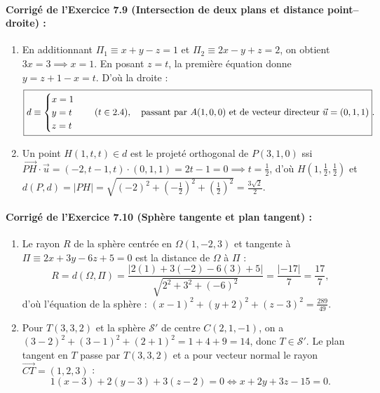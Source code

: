 \paragraph{Corrigé de l'Exercice 7.9 (Intersection de deux plans et distance point--droite) :}
\begin{enumerate}[label=(\alph*)]
    \item En additionnant $\Pi_1 \equiv x + y - z = 1$ et $\Pi_2 \equiv 2x - y + z = 2$, on obtient $3x = 3 \implies x = 1$. En posant $z = t$, la première équation donne $y = z + 1 - x = t$. D'où la droite :
    \[
        \boxed{d \equiv \begin{cases} x = 1 \\ y = t \\ z = t \end{cases} \quad (t \in 2.4), \quad \text{passant par } A(1,0,0) \text{ et de vecteur directeur } \vec{u} = (0, 1, 1)}.
    \]
    \item Un point $H(1, t, t) \in d$ est le projeté orthogonal de $P(3, 1, 0)$ ssi $\overrightarrow{PH} \cdot \vec{u} = (-2, t-1, t)\cdot(0, 1, 1) = 2t - 1 = 0 \implies t = \frac{1}{2}$, d'où $\boxed{H\left(1, \frac{1}{2}, \frac{1}{2}\right)}$ et $d(P, d) = |PH| = \sqrt{(-2)^2 + \left(-\frac{1}{2}\right)^2 + \left(\frac{1}{2}\right)^2} = \boxed{\frac{3\sqrt{2}}{2}}$.
\end{enumerate}

\paragraph{Corrigé de l'Exercice 7.10 (Sphère tangente et plan tangent) :}
\begin{enumerate}[label=(\alph*)]
    \item Le rayon $R$ de la sphère centrée en $\Omega(1, -2, 3)$ et tangente à $\Pi \equiv 2x + 3y - 6z + 5 = 0$ est la distance de $\Omega$ à $\Pi$ :
    \[
        R = d(\Omega, \Pi) = \frac{|2(1) + 3(-2) - 6(3) + 5|}{\sqrt{2^2 + 3^2 + (-6)^2}} = \frac{|-17|}{7} = \frac{17}{7},
    \]
    d'où l'équation de la sphère : $\boxed{(x-1)^2 + (y+2)^2 + (z-3)^2 = \frac{289}{49}}$.
    \item Pour $T(3, 3, 2)$ et la sphère $\mathcal{S}'$ de centre $C(2, 1, -1)$, on a $(3-2)^2 + (3-1)^2 + (2+1)^2 = 1 + 4 + 9 = 14$, donc $T \in \mathcal{S}'$. Le plan tangent en $T$ passe par $T(3,3,2)$ et a pour vecteur normal le rayon $\overrightarrow{CT} = (1, 2, 3)$ :
    \[
        1(x - 3) + 2(y - 3) + 3(z - 2) = 0 \iff \boxed{x + 2y + 3z - 15 = 0}.
    \]
\end{enumerate}
